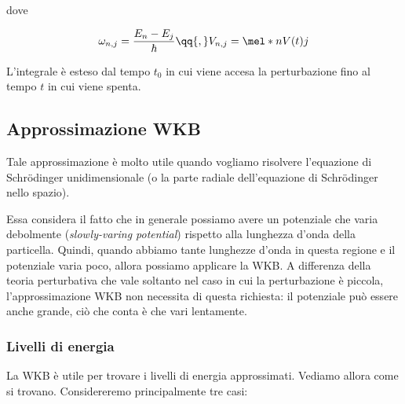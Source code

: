 dove

\begin{equation*}
   \omega_{n,j}=\frac{E_n - E_j}{\hbar}
   \qq{,}
   V_{n,j}=\mel*{n}{V(t)}{j}
\end{equation*}

L'integrale è esteso dal tempo $t_0$ in cui viene accesa la perturbazione fino al tempo $t$ in cui viene spenta.

\subsection*{Approssimazione WKB}

Tale approssimazione è molto utile quando vogliamo risolvere l'equazione di Schrödinger unidimensionale (o la parte radiale dell'equazione di Schrödinger nello spazio).

Essa considera il fatto che in generale possiamo avere un potenziale che varia debolmente (\textit{slowly-varing potential}) rispetto alla lunghezza d'onda della particella. Quindi, quando abbiamo tante lunghezze d'onda in questa regione e il potenziale varia poco, allora possiamo applicare la WKB. A differenza della teoria perturbativa che vale soltanto nel caso in cui la perturbazione è piccola, l'approssimazione WKB non necessita di questa richiesta: il potenziale può essere anche grande, ciò che conta è che vari lentamente.

\subsubsection*{Livelli di energia}
La WKB è utile per trovare i livelli di energia approssimati. Vediamo allora come si trovano. Considereremo principalmente tre casi:


